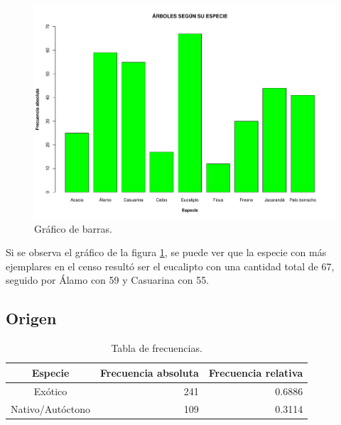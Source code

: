\documentclass[11pt]{article}
\begin{document}
\begin{figure}[h!]
  \begin{center}
    \includegraphics[width=0.9\linewidth]{barrasEspecie.pdf}
    \caption{Gráfico de barras.}
    \label{fig:barrasEspecie}
  \end{center}  
\end{figure}

\begin{justify}
  Si se observa el gráfico de la figura \ref{fig:barrasEspecie},
  se puede ver que la especie con más ejemplares en el censo resultó
  ser el eucalipto con una cantidad total de 67, seguido por Álamo
  con 59 y Casuarina con 55.
\end{justify}


\newpage
\subsection{Origen}

\begin{table}[h!]
  \begin{center}
    \begin{tabular}{| c | r | r |}
      \hline
      \textbf{Especie} & \textbf{Frecuencia absoluta} & 
      \textbf{Frecuencia relativa} \\ \hline
      Exótico	& 241	& 0.6886 \\ \hline
      Nativo/Autóctono & 109 & 0.3114 \\ \hline
    \end{tabular}
    \caption{Tabla de frecuencias.}
    \label{tab:tablaOrigen}
  \end{center}
\end{table}
\end{document}
